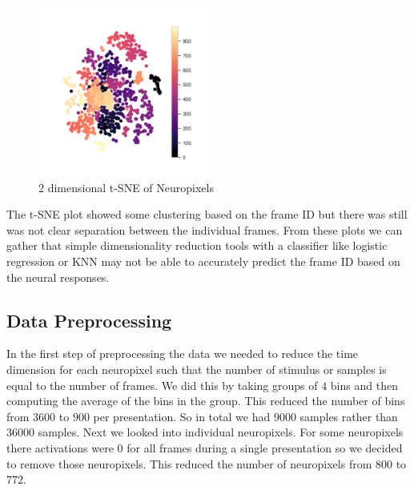 \documentclass[12pt, letterpaper]{article}
\begin{document}
\begin{figure}[H]
    \centering
    \includegraphics[width=0.5\textwidth]{tsne_neuropixels.png}
    \caption{2 dimensional t-SNE of Neuropixels}
    \label{fig:2d_tsne_neuropixels}
\end{figure}

The t-SNE plot showed some clustering based on the frame ID but there was still was not clear separation between the individual frames. From these plots we can gather that simple dimensionality reduction tools with a classifier like logistic regression or KNN may not be able to accurately predict the frame ID based on the neural responses. 

\subsection{Data Preprocessing}
\label{subsec:data_preprocessing}
In the first step of preprocessing the data we needed to reduce the time dimension for each neuropixel such that the number of stimulus or samples is equal to the number of frames. We did this by taking groups of $4$ bins and then computing the average of the bins in the group. This reduced the number of bins from $3600$ to $900$ per presentation. So in total we had $9000$ samples rather than $36000$ samples. Next we looked into individual neuropixels. For some neuropixels there activations were $0$ for all frames during a single presentation so we decided to remove those neuropixels. This reduced the number of neuropixels from $800$ to $772$. 
\end{document}
